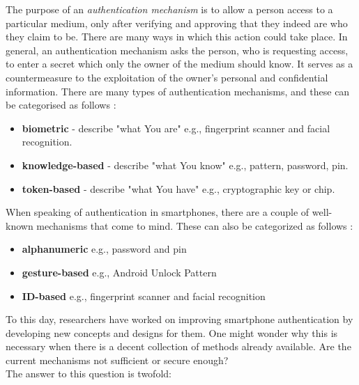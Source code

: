 The purpose of an \textit{authentication mechanism} is to allow a person access to a particular medium, only after verifying and approving that they indeed are who they claim to be. There are many ways in which this action could take place. In general, an authentication mechanism asks the person, who is requesting access, to enter a secret which only the owner of the medium should know. It serves as a countermeasure to the exploitation of the owner's personal and confidential information. There are many types of authentication mechanisms, and these can be categorised as follows \cite{gorman}: 
\begin{itemize}
    \item \textbf{biometric} - describe "what You are" e.g., fingerprint scanner and facial recognition.
    \item \textbf{knowledge-based} - describe "what You know" e.g., pattern, password, pin.
    \item \textbf{token-based} - describe "what You have" e.g., cryptographic key or chip.
\end{itemize}

When speaking of authentication in smartphones, there are a couple of well-known mechanisms that come to mind. These can also be categorized as follows \cite{ediss20251,gorman} : 
\begin{itemize}
    \item \textbf{alphanumeric} e.g., password and pin
    \item \textbf{gesture-based} e.g., Android Unlock Pattern
    \item \textbf{ID-based} e.g., fingerprint scanner and facial recognition 
\end{itemize}

To this day, researchers have worked on improving smartphone authentication by developing new concepts and designs for them. One might wonder why this is necessary when there is a decent collection of methods already available. Are the current mechanisms not sufficient or secure enough? \\

The answer to this question is twofold:\\

